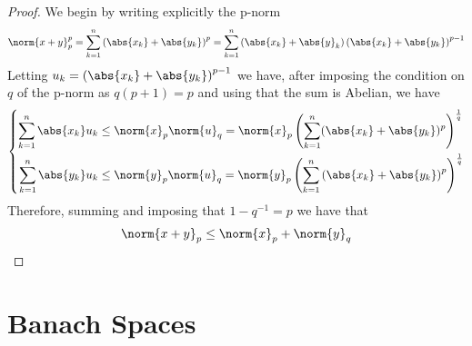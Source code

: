 \documentclass[../mmf.tex]{subfiles}
\begin{document}
\begin{proof}
	We begin by writing explicitly the p-norm
	\begin{equation*}
		\norm{x+y}_p^p=\sum_{k=1}^n\left( \abs{x_k}+\abs{y_k} \right)^p=\sum_{k=1}^n\left( \abs{x_k}+\abs{y}_k \right)\left( \abs{x_k}+\abs{y_k} \right)^{p-1}
	\end{equation*}
	Letting $u_k=\left( \abs{x_k}+\abs{y_k} \right)^{p-1}$ we have, after imposing the condition on $q$ of the p-norm as $q(p+1)=p$ and using that the sum is Abelian, we have
	\begin{equation*}
		\left\{\begin{aligned}
				\sum_{k=1}^n\abs{x_k}u_k&\le\norm{x}_p\norm{u}_q=\norm{x}_p\left(\sum_{k=1}^n(\abs{x_k}+\abs{y_k})^p\right)^{\frac{1}{q}}\\
				\sum_{k=1}^n\abs{y_k}u_k&\le\norm{y}_p\norm{u}_q=\norm{y}_p\left( \sum_{k=1}^n\left( \abs{x_k}+\abs{y_k} \right)^p \right)^{\frac{1}{q}}
		\end{aligned}\right.
	\end{equation*}
	Therefore, summing and imposing that $1-q^{-1}=p$ we have that
	\begin{equation*}
		\norm{x+y}_p\le\norm{x}_p+\norm{y}_q
	\end{equation*}
\end{proof}
\section{Banach Spaces}
\end{document}
